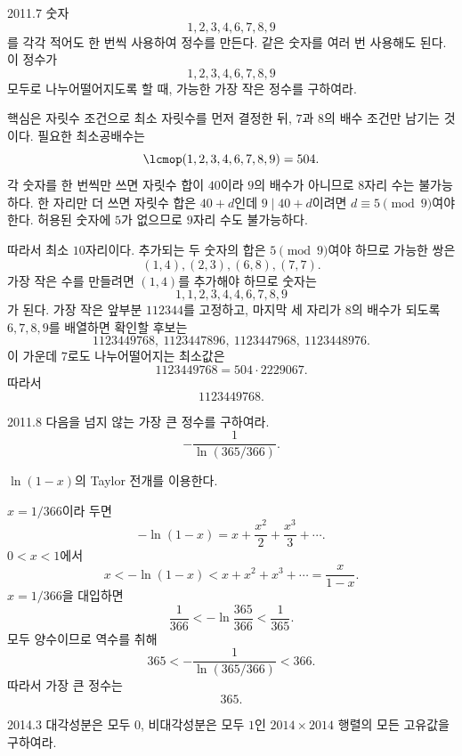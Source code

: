 
\begin{pastproblem}{2011.7}
숫자
\[
1,2,3,4,6,7,8,9
\]
를 각각 적어도 한 번씩 사용하여 정수를 만든다. 같은 숫자를 여러 번 사용해도 된다. 이 정수가
\[
1,2,3,4,6,7,8,9
\]
모두로 나누어떨어지도록 할 때, 가능한 가장 작은 정수를 구하여라.
\end{pastproblem}

\begin{solution}
핵심은 자릿수 조건으로 최소 자릿수를 먼저 결정한 뒤, $7$과 $8$의 배수 조건만 남기는 것이다. 필요한 최소공배수는
\[
\lcmop(1,2,3,4,6,7,8,9)=504.
\]
각 숫자를 한 번씩만 쓰면 자릿수 합이 $40$이라 $9$의 배수가 아니므로 $8$자리 수는 불가능하다. 한 자리만 더 쓰면 자릿수 합은 $40+d$인데 $9\mid40+d$이려면 $d\equiv5\pmod9$여야 한다. 허용된 숫자에 $5$가 없으므로 $9$자리 수도 불가능하다.

따라서 최소 $10$자리이다. 추가되는 두 숫자의 합은 $5\pmod9$여야 하므로 가능한 쌍은
\[
(1,4),(2,3),(6,8),(7,7).
\]
가장 작은 수를 만들려면 $(1,4)$를 추가해야 하므로 숫자는
\[
1,1,2,3,4,4,6,7,8,9
\]
가 된다. 가장 작은 앞부분 $112344$를 고정하고, 마지막 세 자리가 $8$의 배수가 되도록 $6,7,8,9$를 배열하면 확인할 후보는
\[
1123449768,\ 1123447896,\ 1123447968,\ 1123448976.
\]
이 가운데 $7$로도 나누어떨어지는 최소값은
\[
1123449768=504\cdot2229067.
\]
따라서
\[
\boxed{1123449768}.
\]
\end{solution}

\begin{pastproblem}{2011.8}
다음을 넘지 않는 가장 큰 정수를 구하여라.
\[
-\frac{1}{\ln(365/366)}.
\]
\begin{hint}
$\ln(1-x)$의 Taylor 전개를 이용한다.
\end{hint}
\end{pastproblem}

\begin{solution}
$x=1/366$이라 두면
\[
-\ln(1-x)=x+\frac{x^2}{2}+\frac{x^3}{3}+\cdots.
\]
$0<x<1$에서
\[
x<-\ln(1-x)<x+x^2+x^3+\cdots=\frac{x}{1-x}.
\]
$x=1/366$을 대입하면
\[
\frac1{366}<-\ln\frac{365}{366}<\frac1{365}.
\]
모두 양수이므로 역수를 취해
\[
365<-\frac1{\ln(365/366)}<366.
\]
따라서 가장 큰 정수는
\[
\boxed{365}.
\]
\end{solution}

\begin{pastproblem}{2014.3}
대각성분은 모두 $0$, 비대각성분은 모두 $1$인 $2014\times2014$ 행렬의 모든 고유값을 구하여라.
\end{pastproblem}

